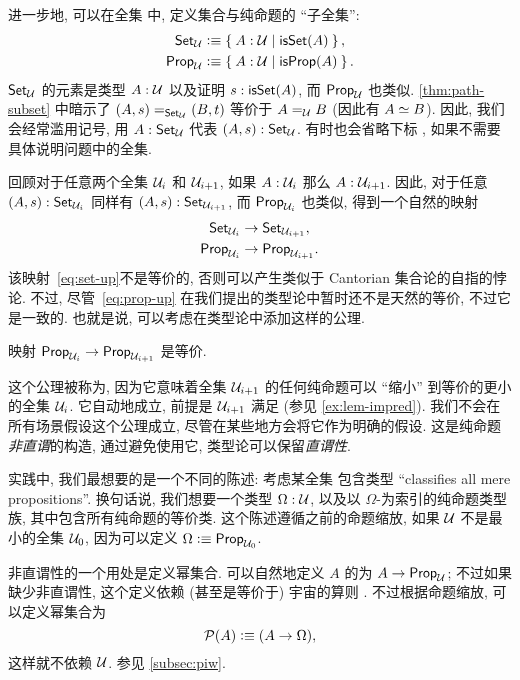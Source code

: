 进一步地, 可以在全集 \UU 中, 定义集合与纯命题的 ``子全集'':
\begin{align*}
    \setU &\defeq \setof{A:\UU | \isset(A) },\\
    \propU &\defeq \setof{A:\UU | \isprop(A) }.
\end{align*}
$\setU$ 的元素是类型 $A:\UU$ 以及证明 $s:\isset(A)$, 而 $\propU$ 也类似.
\cref{thm:path-subset} 中暗示了 $\id[\setU]{(A,s)}{(B,t)}$ 等价于 $\id[\UU]AB$ (因此有 $\eqv AB$).
因此, 我们会经常滥用记号, 用 $A:\setU$ 代表 $(A,s):\setU$.
有时也会省略下标 \UU, 如果不需要具体说明问题中的全集.

回顾对于任意两个全集 $\UU_i$ 和 $\UU_{i+1}$, 如果 $A:\UU_i$ 那么 $A:\UU_{i+1}$.
因此, 对于任意 $(A,s):\set_{\UU_i}$ 同样有 $(A,s):\set_{\UU_{i+1}}$, 而 $\prop_{\UU_i}$ 也类似, 得到一个自然的映射
\begin{align}
    \set_{\UU_i} &\to \set_{\UU_{i+1}}\label{eq:set-up},\\
    \prop_{\UU_i} &\to \prop_{\UU_{i+1}}.\label{eq:prop-up}
\end{align}
该映射~\eqref{eq:set-up}不是等价的, 否则可以产生类似于 Cantorian 集合论的自指的悖论.
不过, 尽管~\eqref{eq:prop-up} 在我们提出的类型论中暂时还不是天然的等价, 不过它是一致的.
也就是说, 可以考虑在类型论中添加这样的公理.

\begin{axiom}[命题缩放]
    映射 $\prop_{\UU_i} \to \prop_{\UU_{i+1}}$ 是等价.
\end{axiom}

这个公理被称为,
因为它意味着全集 $\UU_{i+1}$ 的任何纯命题可以 ``缩小'' 到等价的更小的全集 $\UU_i$.
它自动地成立, 前提是 $\UU_{i+1}$ 满足 \LEM{} (参见 \cref{ex:lem-impred}).
我们不会在所有场景假设这个公理成立, 尽管在某些地方会将它作为明确的假设.
这是纯命题\emph{非直谓}的构造, 通过避免使用它, 类型论可以保留\emph{直谓性}.
%
%

实践中, 我们最想要的是一个不同的陈述: 考虑某全集 \UU 包含类型 ``classifies all mere propositions''.
换句话说, 我们想要一个类型 $\Omega:\UU$, 以及以 $\Omega$-为索引的纯命题类型族, 其中包含所有纯命题的等价类.
这个陈述遵循之前的命题缩放, 如果 $\UU$ 不是最小的全集 $\UU_0$, 因为可以定义 $\Omega\defeq \prop_{\UU_0}$.

非直谓性的一个用处是定义幂集合.
可以自然地定义 $A$ 的为 $A\to\propU$;
不过如果缺少非直谓性, 这个定义依赖 (甚至是等价于) 宇宙的算则 \UU.
不过根据命题缩放, 可以定义幂集合为
%
\[ \power A \defeq (A\to\Omega),\]
这样就不依赖 $\UU$.
参见 \cref{subsec:piw}.


